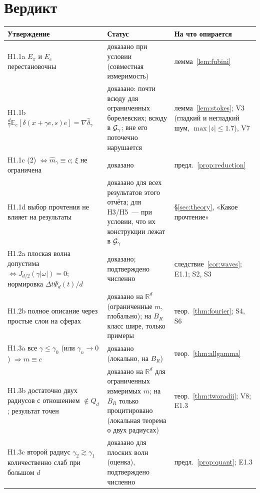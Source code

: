 \documentclass[11pt,a4paper]{article}
\numberwithin{equation}{section}
\theoremstyle{definition}
\theoremstyle{remark}
\newcommand{\E}{\mathbb E}\newcommand{\R}{\mathbb R}\newcommand{\N}{\mathbb N}\let\Prob\relax\newcommand{\Prob}{\mathbb P}
\begin{document}
\section{Вердикт}\label{sec:verdict}
\begin{center}\small
\begin{tabularx}{\textwidth}{@{}p{5.2cm}p{3.0cm}X@{}}
\toprule
\textbf{Утверждение} & \textbf{Статус} & \textbf{На что опирается}\\\midrule
H1.1a $E_\pi$ и $E_e$ перестановочны & доказано при условии (совместная измеримость) & лемма~\ref{lem:fubini} \\
H1.1b $\frac d\gamma\E_e[\delta(x+\gamma e,s)e]=\nabla\hat\delta_\gamma$ & доказано: почти всюду для ограниченных борелевских; всюду в $\mathcal G_\gamma$; вне его поточечно нарушается & лемма~\ref{lem:stokes}; V3 (гладкий и негладкий шум, $\max|z|\le1.7$), V7 \\
H1.1c (2) $\iff\hat m_\gamma\equiv c$; $\xi$ не ограничена & доказано & предл.~\ref{prop:reduction} \\
H1.1d выбор прочтения не влияет на результаты & доказано для всех результатов этого отчёта; для H3/H5~--- при условии, что их конструкции лежат в $\mathcal G_\gamma$ & \S\ref{sec:theory}, «Какое прочтение» \\
H1.2a плоская волна допустима $\iff J_{d/2}(\gamma|\omega|)=0$; нормировка $\Delta t\Psi_d(t)/d$ & доказано; подтверждено численно & следствие~\ref{cor:waves}; E1.1; S2, S3 \\
H1.2b полное описание через простые слои на сферах & доказано на $\R^d$ (ограниченные $m$, глобально); на $B_R$ класс шире, только примеры & теор.~\ref{thm:fourier}; S4, S6 \\
H1.3a все $\gamma\le\gamma_0$ (или $\gamma_n\to0$) $\Rightarrow m\equiv c$ & доказано (локально, на $B_R$) & теор.~\ref{thm:allgamma} \\
H1.3b достаточно двух радиусов с отношением $\notin Q_d$; результат точен & доказано на $\R^d$ для ограниченных измеримых $m$; на $B_R$ только процитировано (локальная теорема о двух радиусах) & теор.~\ref{thm:tworadii}; V8; E1.3 \\
H1.3c второй радиус $\gamma_2\gtrsim\gamma_1$ количественно слаб при большом $d$ & доказано для плоских волн (оценка), подтверждено численно & предл.~\ref{prop:quant}; E1.3 \\
\bottomrule
\end{tabularx}
\end{center}
\end{document}
